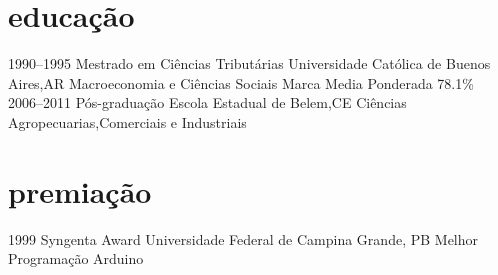 \documentclass[a4paper]{myfriggeri-cv}
\begin{document}
\subsection{}
\begin{entrylist}
\end{entrylist}
\section{educação}
\begin{entrylist}
\entry
{1990--1995}
{Mestrado {\normalfont em Ciências Tributárias}}
{Universidade Católica de Buenos Aires,AR}
{Macroeconomia e Ciências Sociais}
{Marca Media Ponderada 78.1\%}
\entry
{2006--2011}
{Pós-graduação}
{Escola Estadual de Belem,CE}
{Ciências Agropecuarias,Comerciais e Industriais}
{
}
\end{entrylist}
\section{premiação}
\begin{entrylist}

\entry
{1999}
{Syngenta Award }
{Universidade Federal de Campina Grande, PB}
{Melhor Programação Arduino}
{}
\end{entrylist}
\end{document}
